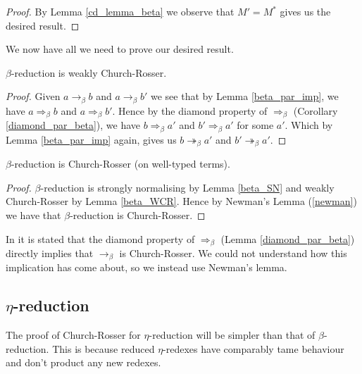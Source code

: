 \begin{proof}
    By Lemma \ref{cd_lemma_beta} we observe that $M' = M^*$ gives us the desired result.
\end{proof}

We now have all we need to prove our desired result.

\begin{lemma}\label{beta_WCR}
    $\beta$-reduction is weakly Church-Rosser.
\end{lemma}

\begin{proof}
    Given $a \to_\beta b$ and $a \to_\beta b'$ we see that by Lemma \ref{beta_par_imp}, we have $a \Rightarrow_\beta b$ and $a \Rightarrow_\beta b'$. Hence by the diamond property of $\Rightarrow_\beta$ (Corollary \ref{diamond_par_beta}), we have $b \Rightarrow_\beta a'$ and $b' \Rightarrow_\beta a'$ for some $a'$. Which by Lemma \ref{beta_par_imp} again, gives us $b \twoheadrightarrow_\beta a'$ and $b' \twoheadrightarrow_\beta a'$.
\end{proof}

\begin{theorem}
    $\beta$-reduction is Church-Rosser (on well-typed terms).
\end{theorem}

\begin{proof}
    $\beta$-reduction is strongly normalising by Lemma \ref{beta_SN} and weakly Church-Rosser by Lemma \ref{beta_WCR}. Hence by Newman's Lemma (\ref{newman}) we have that $\beta$-reduction is Church-Rosser. 
\end{proof}

\begin{remark}
    In \cite{Takahashi:1995:PR9:207177.207191, barendregt1984lambda} it is stated that the diamond property of $\Rightarrow_\beta$ (Lemma \ref{diamond_par_beta}) directly implies that $\to_\beta$ is Church-Rosser. We could not understand how this implication has come about, so we instead use Newman's lemma.
\end{remark}



\subsection{ \texorpdfstring{$\eta$}{}-reduction}

The proof of Church-Rosser for $\eta$-reduction will be simpler than that of $\beta$-reduction. This is because reduced $\eta$-redexes have comparably tame behaviour and don't product any new redexes.

